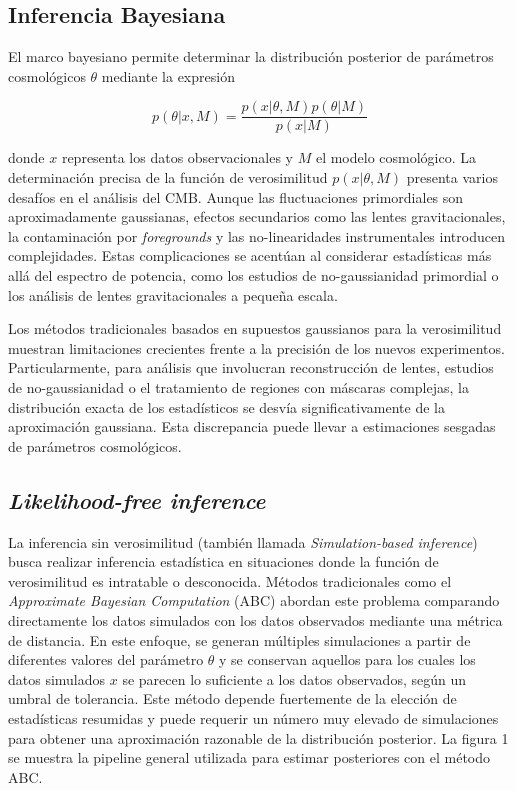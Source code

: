 \documentclass[11pt]{article}
\begin{document}
\subsection{Inferencia Bayesiana}
El marco bayesiano permite determinar la distribución posterior de parámetros cosmológicos $\theta$ mediante la expresión 

\begin{equation}
p(\theta|x,M) = \frac{p(x|\theta,M)p(\theta|M)}{p(x|M)}
\end{equation}

donde $x$ representa los datos observacionales y $M$ el modelo cosmológico. La determinación precisa de la función de verosimilitud $p(x|\theta,M)$ presenta varios desafíos en el análisis del CMB. Aunque las fluctuaciones primordiales son aproximadamente gaussianas, efectos secundarios como las lentes gravitacionales, la contaminación por \textit{foregrounds} y las no-linearidades instrumentales introducen complejidades. Estas complicaciones se acentúan al considerar estadísticas más allá del espectro de potencia, como los estudios de no-gaussianidad primordial o los análisis de lentes gravitacionales a pequeña escala.

Los métodos tradicionales basados en supuestos gaussianos para la verosimilitud muestran limitaciones crecientes frente a la precisión de los nuevos experimentos. Particularmente, para análisis que involucran reconstrucción de lentes, estudios de no-gaussianidad o el tratamiento de regiones con máscaras complejas, la distribución exacta de los estadísticos se desvía significativamente de la aproximación gaussiana. Esta discrepancia puede llevar a estimaciones sesgadas de parámetros cosmológicos.

\subsection{\textit{Likelihood-free inference}}
La inferencia sin verosimilitud (también llamada \textit{Simulation-based inference}) busca realizar inferencia estadística en situaciones donde la función de verosimilitud es intratable o desconocida. Métodos tradicionales como el \textit{Approximate Bayesian Computation} (ABC) abordan este problema comparando directamente los datos simulados con los datos observados mediante una métrica de distancia. En este enfoque, se generan múltiples simulaciones a partir de diferentes valores del parámetro $\theta$ y se conservan aquellos para los cuales los datos simulados $x$ se parecen lo suficiente a los datos observados, según un umbral de tolerancia. Este método depende fuertemente de la elección de estadísticas resumidas y puede requerir un número muy elevado de simulaciones para obtener una aproximación razonable de la distribución posterior. La figura 1 se muestra la pipeline general utilizada para estimar posteriores con el método ABC.
\end{document}
